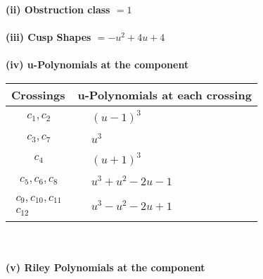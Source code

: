 \documentclass[1p]{elsarticle_modified}
\theoremstyle{definition}
\begin{document}
\flushleft \textbf{(ii) Obstruction class $= 1$}\\~\\
\flushleft \textbf{(iii) Cusp Shapes $= - u^2+4 u+4$}\\~\\
\newpage\renewcommand{\arraystretch}{1}
\flushleft \textbf{(iv) u-Polynomials at the component}\newline \\
\begin{tabular}{m{50pt}|m{274pt}}
Crossings & \hspace{64pt}u-Polynomials at each crossing \\
\hline $$\begin{aligned}c_{1},c_{2}\end{aligned}$$&$\begin{aligned}
&(u-1)^3
\end{aligned}$\\
\hline $$\begin{aligned}c_{3},c_{7}\end{aligned}$$&$\begin{aligned}
&u^3
\end{aligned}$\\
\hline $$\begin{aligned}c_{4}\end{aligned}$$&$\begin{aligned}
&(u+1)^3
\end{aligned}$\\
\hline $$\begin{aligned}c_{5},c_{6},c_{8}\end{aligned}$$&$\begin{aligned}
&u^3+u^2-2 u-1
\end{aligned}$\\
\hline $$\begin{aligned}c_{9},c_{10},c_{11}\\c_{12}\end{aligned}$$&$\begin{aligned}
&u^3- u^2-2 u+1
\end{aligned}$\\
\hline
\end{tabular}\\~\\
\newpage\renewcommand{\arraystretch}{1}
\flushleft \textbf{(v) Riley Polynomials at the component}\newline \\
\end{document}
